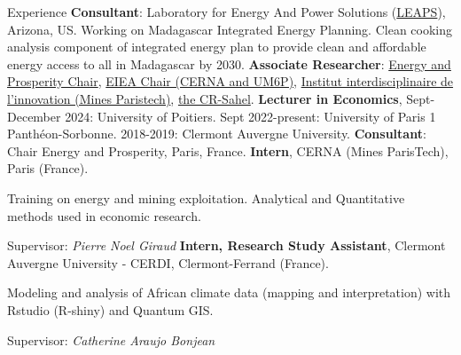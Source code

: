 \begin{rubric}{\small Experience}
	\textbf{Consultant}: Laboratory for Energy And Power Solutions (\href{https://leaps.asu.edu/newprojectspage/}{LEAPS}), Arizona, US.
Working on Madagascar Integrated Energy Planning. Clean cooking analysis component of integrated energy plan to provide clean and affordable energy access to all in Madagascar by 2030.
\entry*[2021 -- 2024]%
	\textbf{Associate Researcher}: \href{http://www.chair-energy-prosperity.org/en/category/research-fellows-1/mboundor-diouf-en/}{Energy and Prosperity Chair}, \href{https://www.cerna.minesparis.psl.eu/Equipe/Doctorant-e-s/Mboundor-Diouf/}{EIEA Chair (CERNA and UM6P)}, \href{https://i3.cnrs.fr/membres/}{Institut interdisciplinaire de l'innovation (Mines Paristech)}, \href{https://crs-g5-sahel.com/team/diouf-mboundo/}{the CR-Sahel}.
 \entry*[2018 -- present]%
	\textbf{Lecturer in Economics}, 
Sept-December 2024: University of Poitiers. Sept 2022-present: University of Paris 1 Panthéon-Sorbonne. 2018-2019: Clermont Auvergne University.
	\textbf{Consultant}: Chair Energy and Prosperity, Paris, France.
%
	\textbf{Intern}, CERNA (Mines ParisTech), Paris (France).\par
 Training on energy and mining exploitation. Analytical and Quantitative methods used in economic research.\par
 Supervisor: \emph{Pierre Noel Giraud} 
\entry*[2018 -- 2019]%
	\textbf{Intern, 
Research Study Assistant}, Clermont Auvergne University -
CERDI, Clermont-Ferrand (France).\par
Modeling and analysis of African climate data (mapping and interpretation) with Rstudio (R-shiny) and Quantum GIS.
\par Supervisor: \emph{Catherine Araujo Bonjean} 
\end{rubric}
